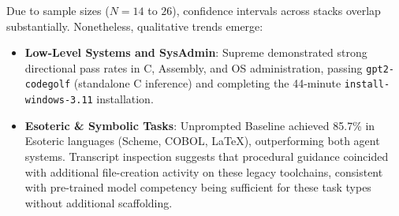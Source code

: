 Due to sample sizes ($N=14$ to $26$), confidence intervals across stacks overlap substantially. Nonetheless, qualitative trends emerge:
\begin{itemize}
    \item \textbf{Low-Level Systems and SysAdmin}: Supreme demonstrated strong directional pass rates in C, Assembly, and OS administration, passing \texttt{gpt2-codegolf} (standalone C inference) and completing the 44-minute \texttt{install-windows-3.11} installation.
    \item \textbf{Esoteric \& Symbolic Tasks}: Unprompted Baseline achieved 85.7\% in Esoteric languages (Scheme, COBOL, LaTeX), outperforming both agent systems. Transcript inspection suggests that procedural guidance coincided with additional file-creation activity on these legacy toolchains, consistent with pre-trained model competency being sufficient for these task types without additional scaffolding.
\end{itemize}

